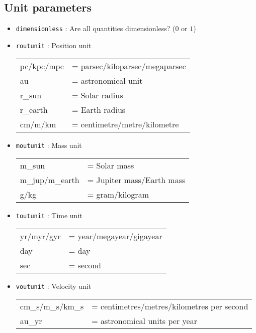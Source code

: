 \documentclass[a4paper]{article}
\newcommand{\var}[1]{\texttt{#1}}
\begin{document}
\subsection{Unit parameters} \label{SS:UNITPARAMS}

\begin{itemize}
\item \var{dimensionless} : Are all quantities dimensionless? ($0$ or $1$)

\item \var{routunit} : Position unit \vspace{0.1cm} \\
\begin{tabular}{ll}
pc/kpc/mpc & = parsec/kiloparsec/megaparsec \\
au         & = astronomical unit \\
r\_sun     & = Solar radius \\
r\_earth   & = Earth radius \\
cm/m/km    & = centimetre/metre/kilometre
\end{tabular}

\item \var{moutunit} : Mass unit \vspace{0.1cm} \\
\begin{tabular}{ll}
m\_sun          & = Solar mass \\
m\_jup/m\_earth & = Jupiter mass/Earth mass \\
g/kg            & = gram/kilogram
\end{tabular}

\item \var{toutunit} : Time unit \\
\begin{tabular}{ll}
yr/myr/gyr & = year/megayear/gigayear \\
day        & = day \\
sec        & = second
\end{tabular}

\item \var{voutunit} : Velocity unit \\
\begin{tabular}{ll}
cm\_s/m\_s/km\_s & = centimetres/metres/kilometres per second \\
au\_yr           & = astronomical units per year
\end{tabular}


\end{itemize}
\end{document}
